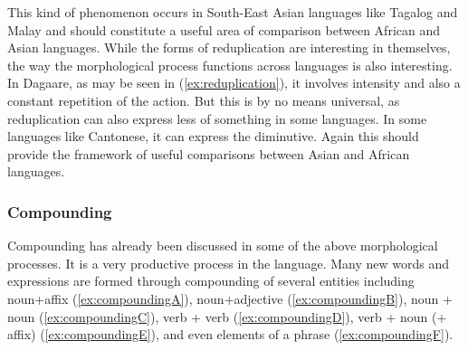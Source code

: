 

This kind of phenomenon occurs in South-East Asian languages like Tagalog and Malay and should constitute a useful area of comparison between African and Asian languages. While the forms of reduplication are interesting in themselves, the way the
morphological process functions across languages is also interesting. In Dagaare, as may be
seen in (\ref{ex:reduplication}), it involves intensity and also a constant repetition of the action. But this is by no
means universal, as reduplication can also express less of something in some languages. In
some languages like Cantonese, it can express the diminutive. Again this should provide the
framework of useful comparisons between Asian and African languages.

\subsubsection{Compounding}
Compounding has already been discussed in some of the above morphological
processes. It is a very productive process in the language. Many new words and expressions are formed through compounding of several entities including noun+affix (\ref{ex:compoundingA}),
noun+adjective (\ref{ex:compoundingB}), noun + noun (\ref{ex:compoundingC}), verb + verb (\ref{ex:compoundingD}), verb + noun (+ affix) (\ref{ex:compoundingE}), and
even elements of a phrase (\ref{ex:compoundingF}).

